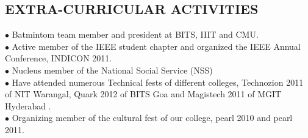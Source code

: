 \documentclass[7pt]{article}
\begin{document}
\begin{small}
\section{EXTRA-CURRICULAR ACTIVITIES} 
$\bullet$ Batmintom team member and president at BITS, IIIT and CMU.\\
$\bullet$ Active member of the IEEE student chapter and organized the IEEE Annual Conference, INDICON 2011.\\
$\bullet$ Nucleus member of the National Social Service (NSS) \\
$\bullet$ Have attended numerous Technical fests of different colleges, Technozion 2011 of NIT Warangal, Quark 2012 of BITS Goa and Magistech 2011 of MGIT Hyderabad .\\
$\bullet$ Organizing member of the cultural fest of our college, pearl 2010 and pearl 2011.\\


\end{small}
\end{document}

